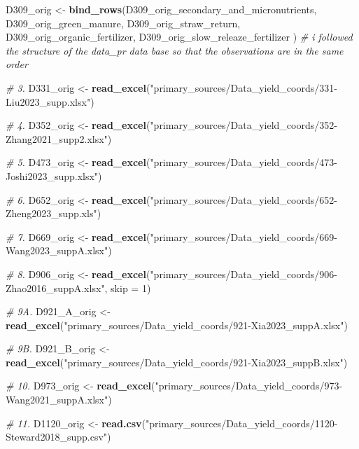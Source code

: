 \documentclass[
]{article}
\newenvironment{Shaded}{\begin{snugshade}}{\end{snugshade}}
\newcommand{\AttributeTok}[1]{\textcolor[rgb]{0.13,0.29,0.53}{#1}}
\newcommand{\CommentTok}[1]{\textcolor[rgb]{0.56,0.35,0.01}{\textit{#1}}}
\newcommand{\DecValTok}[1]{\textcolor[rgb]{0.00,0.00,0.81}{#1}}
\newcommand{\FunctionTok}[1]{\textcolor[rgb]{0.13,0.29,0.53}{\textbf{#1}}}
\newcommand{\NormalTok}[1]{#1}
\newcommand{\OtherTok}[1]{\textcolor[rgb]{0.56,0.35,0.01}{#1}}
\newcommand{\StringTok}[1]{\textcolor[rgb]{0.31,0.60,0.02}{#1}}
\begin{document}
\begin{Shaded}
\begin{Highlighting}[]
\NormalTok{D309\_orig }\OtherTok{\textless{}{-}} \FunctionTok{bind\_rows}\NormalTok{(D309\_orig\_secondary\_and\_micronutrients, D309\_orig\_green\_manure, D309\_orig\_straw\_return, D309\_orig\_organic\_fertilizer, D309\_orig\_slow\_releaze\_fertilizer ) }\CommentTok{\# i followed the structure of the data\_pr data base so that the observations are in the same order}


\CommentTok{\# 3.}
\NormalTok{D331\_orig }\OtherTok{\textless{}{-}} \FunctionTok{read\_excel}\NormalTok{(}\StringTok{"primary\_sources/Data\_yield\_coords/331{-}Liu2023\_supp.xlsx"}\NormalTok{)}

\CommentTok{\# 4.}
\NormalTok{D352\_orig }\OtherTok{\textless{}{-}} \FunctionTok{read\_excel}\NormalTok{(}\StringTok{"primary\_sources/Data\_yield\_coords/352{-}Zhang2021\_supp2.xlsx"}\NormalTok{)}

\CommentTok{\# 5.}
\NormalTok{D473\_orig }\OtherTok{\textless{}{-}} \FunctionTok{read\_excel}\NormalTok{(}\StringTok{"primary\_sources/Data\_yield\_coords/473{-}Joshi2023\_supp.xlsx"}\NormalTok{)}

\CommentTok{\# 6.}
\NormalTok{D652\_orig }\OtherTok{\textless{}{-}} \FunctionTok{read\_excel}\NormalTok{(}\StringTok{"primary\_sources/Data\_yield\_coords/652{-}Zheng2023\_supp.xls"}\NormalTok{)}

\CommentTok{\# 7.}
\NormalTok{D669\_orig }\OtherTok{\textless{}{-}} \FunctionTok{read\_excel}\NormalTok{(}\StringTok{"primary\_sources/Data\_yield\_coords/669{-}Wang2023\_suppA.xlsx"}\NormalTok{)}

\CommentTok{\# 8.}
\NormalTok{D906\_orig }\OtherTok{\textless{}{-}} \FunctionTok{read\_excel}\NormalTok{(}\StringTok{"primary\_sources/Data\_yield\_coords/906{-}Zhao2016\_suppA.xlsx"}\NormalTok{, }\AttributeTok{skip =} \DecValTok{1}\NormalTok{)}

\CommentTok{\# 9A.}
\NormalTok{D921\_A\_orig }\OtherTok{\textless{}{-}} \FunctionTok{read\_excel}\NormalTok{(}\StringTok{"primary\_sources/Data\_yield\_coords/921{-}Xia2023\_suppA.xlsx"}\NormalTok{)}

\CommentTok{\# 9B.}
\NormalTok{D921\_B\_orig }\OtherTok{\textless{}{-}} \FunctionTok{read\_excel}\NormalTok{(}\StringTok{"primary\_sources/Data\_yield\_coords/921{-}Xia2023\_suppB.xlsx"}\NormalTok{)}

\CommentTok{\# 10.}
\NormalTok{D973\_orig }\OtherTok{\textless{}{-}} \FunctionTok{read\_excel}\NormalTok{(}\StringTok{"primary\_sources/Data\_yield\_coords/973{-}Wang2021\_suppA.xlsx"}\NormalTok{)}

\CommentTok{\# 11.}
\NormalTok{D1120\_orig }\OtherTok{\textless{}{-}} \FunctionTok{read.csv}\NormalTok{(}\StringTok{"primary\_sources/Data\_yield\_coords/1120{-}Steward2018\_supp.csv"}\NormalTok{)}
\end{Highlighting}
\end{Shaded}
\end{document}
